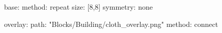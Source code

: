 base:
  method: repeat
  size: [8,8]
  symmetry: none

overlay:
  path: "Blocks/Building/cloth_overlay.png"
  method: connect